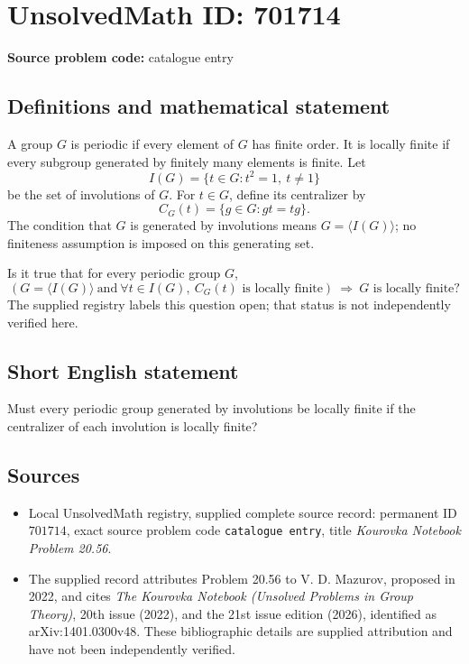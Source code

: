 \documentclass[11pt]{article}
\begin{document}
\section*{UnsolvedMath ID: 701714}
\textbf{Source problem code:} catalogue entry
\subsection{Definitions and mathematical statement}
A group \(G\) is periodic if every element of \(G\) has finite order. It is locally finite if every subgroup generated by finitely many elements is finite. Let
\[
I(G)=\{t\in G:t^2=1,\ t\ne 1\}
\]
be the set of involutions of \(G\). For \(t\in G\), define its centralizer by
\[
C_G(t)=\{g\in G:gt=tg\}.
\]
The condition that \(G\) is generated by involutions means \(G=\langle I(G)\rangle\); no finiteness assumption is imposed on this generating set.

Is it true that for every periodic group \(G\),
\[
\left(G=\langle I(G)\rangle\ \text{and}\ \forall t\in I(G),\ C_G(t)\text{ is locally finite}\right)
\ \Longrightarrow\ G\text{ is locally finite}?
\]
The supplied registry labels this question open; that status is not independently verified here.
\subsection{Short English statement}
Must every periodic group generated by involutions be locally finite if the centralizer of each involution is locally finite?
\subsection{Sources}
\begin{itemize}
\item Local UnsolvedMath registry, supplied complete source record: permanent ID \(701714\), exact source problem code \texttt{catalogue entry}, title \emph{Kourovka Notebook Problem 20.56}.
\item The supplied record attributes Problem 20.56 to V. D. Mazurov, proposed in 2022, and cites \emph{The Kourovka Notebook (Unsolved Problems in Group Theory)}, 20th issue (2022), and the 21st issue edition (2026), identified as arXiv:1401.0300v48. These bibliographic details are supplied attribution and have not been independently verified.
\end{itemize}
\end{document}

